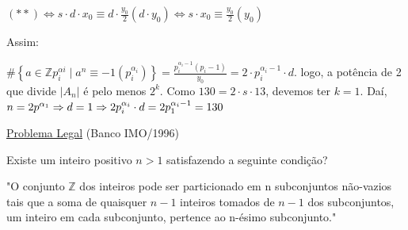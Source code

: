 \documentclass[a4paper,12pt]{article}
\newcommand*{\hm}[1]{#1\nobreak\discretionary{}
	{\hbox{$\mathsurround=0pt #1$}}{}}
\theoremstyle{plain} %
\theoremstyle{definition} %
\theoremstyle{remark} %
\begin{document}
\begin{framed}
		$(\ast\ast)\Leftrightarrow s \cdot d \cdot x_{0} \equiv d \cdot \frac{y_{0}}{2}\left(d \cdot y_{0}\right) \Leftrightarrow s \cdot x_{0} \equiv \frac{y_{0}}{2}\left(y_{0}\right)$ 
		
		Assim:
		
		$\#\left\{a \in \mathds{Z} p_{i}^{\alpha i} \mid a^{n} \equiv-1\left(p_i^{\alpha_{i}}\right)\right\}=\frac{p_{i}^{\alpha_i-1}\left(p_{i}-1\right)}{y_{0}}=2 \cdot p_{i}^{\alpha_{i}-1} \cdot d$. logo, a pot\^encia de 2 que divide $|A_n|$ \'e pelo menos $2^k$. Como $130=2\cdot s\cdot 13$, devemos ter $k=1$. Da\'i, $n=2 p^{\alpha_{1}}\Rightarrow d=1\Rightarrow2 p_{i}^{\alpha_{i}} \cdot d\hm{=}2 p_{1}^{\alpha_{i}-1}=130$ \tiny\textblock
		
		\normalsize
		
	\end{framed}
	
	\vspace{2ex}\underline{Problema Legal} (Banco IMO/1996)
	
	Existe um inteiro positivo $n>1$ satisfazendo a seguinte condi\c{c}\~ao?
	
	"O conjunto $\mathds{Z}$ dos inteiros pode ser particionado em n subconjuntos n\~ao-vazios tais que a soma de quaisquer $n-1$ inteiros tomados de $n-1$ dos subconjuntos, um inteiro em cada subconjunto, pertence ao n-\'esimo subconjunto."
	
\end{document}

